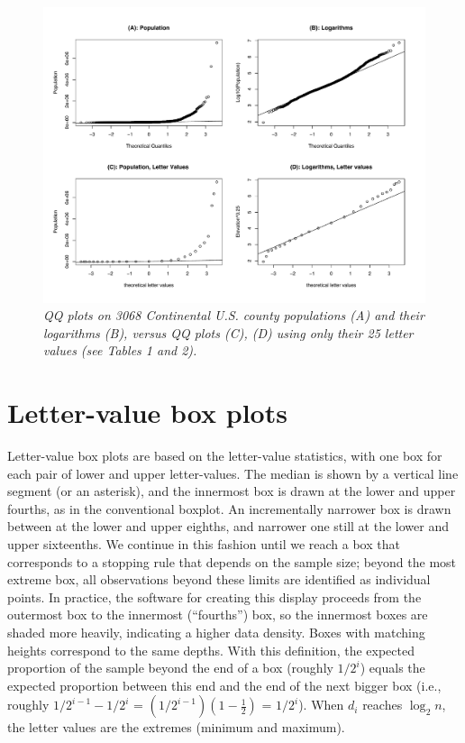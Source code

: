 \documentclass[11pt]{article}
\begin{document}
\begin{figure}[hbt]
\begin{center}
\includegraphics[scale=.5,angle=270]{qqpop4}
\caption{\it \label{qqpop4} QQ plots on 3068 Continental U.S. county
populations (A) and their logarithms (B), versus QQ plots (C), (D) 
using only their 25 letter values (see Tables 1 and 2).}
\end{center}
\end{figure}



\section{Letter-value box plots}

Letter-value box plots are based on the letter-value statistics,
with one box for each pair of lower and upper letter-values.
The median is shown by a vertical line segment (or an asterisk),
and the innermost box is drawn at the lower and upper fourths, 
as in the conventional boxplot.
An incrementally narrower box is drawn between at the lower
and upper eighths, and narrower one still at the lower
and upper sixteenths.
We continue in this fashion until we reach a box that corresponds 
to a stopping rule that depends on the sample size; beyond the 
most extreme box, all observations beyond these limits 
are identified as individual points.
In practice, the software for creating this display
proceeds from the outermost box to the innermost (``fourths'')
box, so the innermost boxes are shaded more heavily,
indicating a higher data density.
Boxes with matching heights correspond to the same depths.
With this definition, the expected proportion of the 
sample beyond the end of a box (roughly $1/2^i$)
equals the expected proportion between this end 
and the end of the next bigger box
(i.e., roughly $1/2^{i-1} - 1/2^i$ = $(1/2^{i-1})(1 - \frac{1}{2})$
= $1 / 2^i$).
When $d_i$ reaches $\log_2 n$, the letter values are the extremes
(minimum and maximum).
\end{document}
